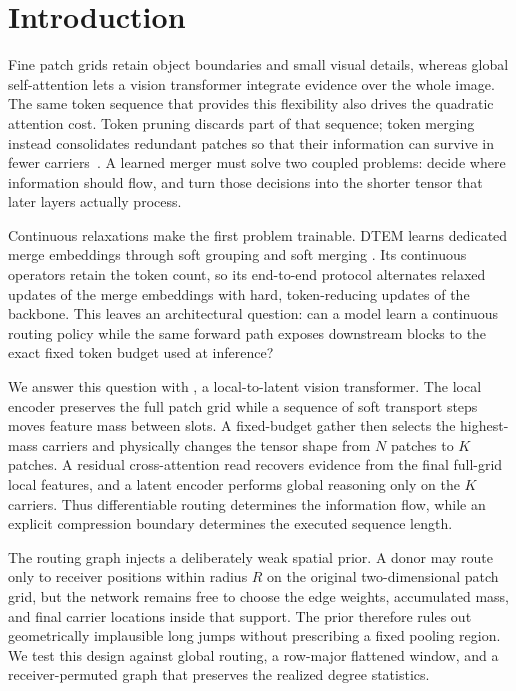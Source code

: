 \section{Introduction}

Fine patch grids retain object boundaries and small visual details, whereas
global self-attention lets a vision transformer integrate evidence over the
whole image. The same token sequence that provides this flexibility also
drives the quadratic attention cost. Token pruning discards part of that
sequence; token merging instead consolidates redundant patches so that their
information can survive in fewer carriers~\cite{tome2023}. A learned merger
must solve two coupled problems: decide where information should flow, and
turn those decisions into the shorter tensor that later layers actually
process.

Continuous relaxations make the first problem trainable. DTEM learns
dedicated merge embeddings through soft grouping and soft merging
\cite{dtem2024}. Its continuous operators retain the token count, so its
end-to-end protocol alternates relaxed updates of the merge embeddings with
hard, token-reducing updates of the backbone. This leaves an architectural
question: can a model learn a continuous routing policy while the same
forward path exposes downstream blocks to the exact fixed token budget used
at inference?

We answer this question with \mn{}, a local-to-latent vision transformer.
The local encoder preserves the full patch grid while a sequence of soft
transport steps moves feature mass between slots. A fixed-budget gather then
selects the highest-mass carriers and physically changes the tensor shape from
$N$ patches to $K$ patches. A residual cross-attention read recovers evidence
from the final full-grid local features, and a latent encoder performs global
reasoning only on the $K$ carriers. Thus differentiable routing determines
the information flow, while an explicit compression boundary determines the
executed sequence length.

The routing graph injects a deliberately weak spatial prior. A donor may
route only to receiver positions within radius $R$ on the original
two-dimensional patch grid, but the network remains free to choose the edge
weights, accumulated mass, and final carrier locations inside that support.
The prior therefore rules out geometrically implausible long jumps without
prescribing a fixed pooling region. We test this design against global
routing, a row-major flattened window, and a receiver-permuted graph that
preserves the realized degree statistics.

